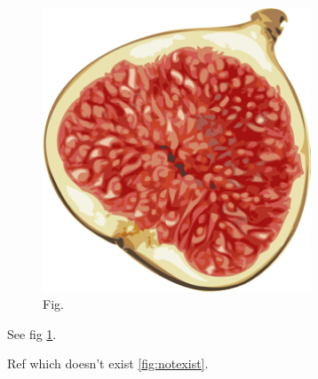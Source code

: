 
  \begin{figure}[h]
    \includegraphics[width=8cm]{fig.png}
    \caption{Fig.}
    \label{fig:fig}
  \end{figure}
  See fig \ref{fig:fig}.

  Ref which doesn't exist \ref{fig:notexist}.

